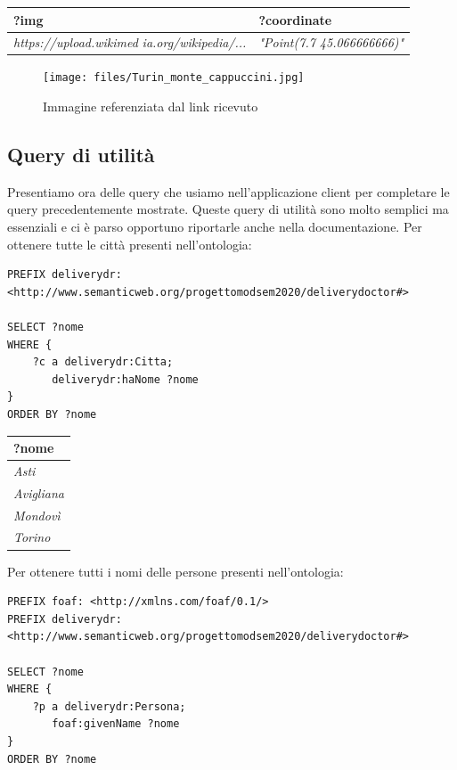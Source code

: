 \documentclass[12pt]{article}
\begin{document}
\begin{tabularx}{\textwidth} { 
  | >{\centering\arraybackslash}X
  | >{\centering\arraybackslash}X |}
 \hline
 \textbf{?img} & \textbf{?coordinate} \\
 \hline
 \textit{https://upload.wikimed} \textit{ia.org/wikipedia/...} & \textit{"Point(7.7 45.066666666)"} \\
\hline
\end{tabularx}
\newline
\begin{figure}[H]
    \centering
         \texttt{[image: files/Turin\_monte\_cappuccini.jpg]}
    \caption{Immagine referenziata dal link ricevuto}
\end{figure}
\newpage
\subsection{Query di utilità}
Presentiamo ora delle query che usiamo nell'applicazione client per completare le query precedentemente mostrate. Queste query di utilità sono molto semplici ma essenziali e ci è parso opportuno riportarle anche nella documentazione.\newline
Per ottenere tutte le città presenti nell'ontologia:
\begin{lstlisting}[language=SPARQL]
PREFIX deliverydr: 
<http://www.semanticweb.org/progettomodsem2020/deliverydoctor#>

SELECT ?nome
WHERE {
    ?c a deliverydr:Citta;
       deliverydr:haNome ?nome
}
ORDER BY ?nome
\end{lstlisting}
\begin{tabularx}{\textwidth} { 
  | >{\centering\arraybackslash}X |}
 \hline
 \textbf{?nome} \\
 \hline
 \textit{Asti} \\
 \hline
 \textit{Avigliana} \\
 \hline
 \textit{Mondovì} \\
 \hline
 \textit{Torino} \\
\hline
\end{tabularx}
\newline
\newline
Per ottenere tutti i nomi delle persone presenti nell'ontologia:
\begin{lstlisting}[language=SPARQL]
PREFIX foaf: <http://xmlns.com/foaf/0.1/>
PREFIX deliverydr: 
<http://www.semanticweb.org/progettomodsem2020/deliverydoctor#>

SELECT ?nome
WHERE {
    ?p a deliverydr:Persona;
       foaf:givenName ?nome
}
ORDER BY ?nome
\end{lstlisting}
\end{document}
